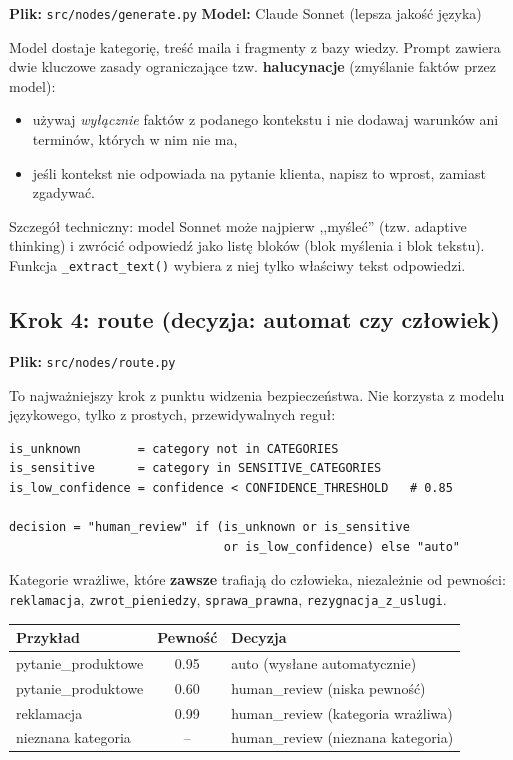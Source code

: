 \documentclass[11pt,a4paper]{article}
\newcommand{\plik}[1]{\texttt{#1}}
\begin{document}
\textbf{Plik:} \plik{src/nodes/generate.py}\quad
\textbf{Model:} Claude Sonnet (lepsza jakość języka)

Model dostaje kategorię, treść maila i fragmenty z bazy wiedzy. Prompt
zawiera dwie kluczowe zasady ograniczające tzw. \textbf{halucynacje}
(zmyślanie faktów przez model):

\begin{itemize}
  \item używaj \emph{wyłącznie} faktów z podanego kontekstu i nie dodawaj
        warunków ani terminów, których w nim nie ma,
  \item jeśli kontekst nie odpowiada na pytanie klienta, napisz to wprost,
        zamiast zgadywać.
\end{itemize}

Szczegół techniczny: model Sonnet może najpierw ,,myśleć'' (tzw. adaptive
thinking) i zwrócić odpowiedź jako listę bloków (blok myślenia i blok
tekstu). Funkcja \texttt{\_extract\_text()} wybiera z niej tylko właściwy
tekst odpowiedzi.

\subsection{Krok 4: route (decyzja: automat czy człowiek)}

\textbf{Plik:} \plik{src/nodes/route.py}

To najważniejszy krok z punktu widzenia bezpieczeństwa. Nie korzysta z modelu
językowego, tylko z prostych, przewidywalnych reguł:

\begin{lstlisting}
is_unknown        = category not in CATEGORIES
is_sensitive      = category in SENSITIVE_CATEGORIES
is_low_confidence = confidence < CONFIDENCE_THRESHOLD   # 0.85

decision = "human_review" if (is_unknown or is_sensitive
                              or is_low_confidence) else "auto"
\end{lstlisting}

Kategorie wrażliwe, które \textbf{zawsze} trafiają do człowieka, niezależnie
od pewności: \texttt{reklamacja}, \texttt{zwrot\_pieniedzy},
\texttt{sprawa\_prawna}, \texttt{rezygnacja\_z\_uslugi}.

\begin{center}
\renewcommand{\arraystretch}{1.2}
\begin{tabular}{@{}l c l@{}}
\toprule
\textbf{Przykład} & \textbf{Pewność} & \textbf{Decyzja} \\
\midrule
pytanie\_produktowe & 0.95 & auto (wysłane automatycznie) \\
pytanie\_produktowe & 0.60 & human\_review (niska pewność) \\
reklamacja          & 0.99 & human\_review (kategoria wrażliwa) \\
nieznana kategoria  & --   & human\_review (nieznana kategoria) \\
\bottomrule
\end{tabular}
\end{center}
\end{document}
